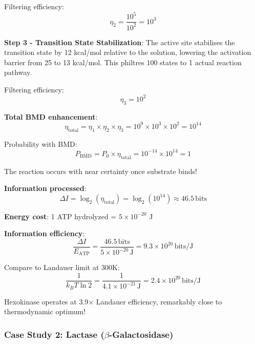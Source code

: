 \documentclass[11pt,onecolumn]{article}
\begin{document}
Filtering efficiency:
\begin{equation}
\eta_2 = \frac{10^5}{10^2} = 10^3
\end{equation}

\textbf{Step 3 - Transition State Stabilization}: The active site stabilises the transition state by 12 kcal/mol relative to the solution, lowering the activation barrier from 25 to 13 kcal/mol. This philtres 100 states to 1 actual reaction pathway.

Filtering efficiency:
\begin{equation}
\eta_3 = 10^2
\end{equation}

\textbf{Total BMD enhancement}:
\begin{equation}
\eta_{\text{total}} = \eta_1 \times \eta_2 \times \eta_3 = 10^9 \times 10^3 \times 10^2 = 10^{14}
\end{equation}

Probability with BMD:
\begin{equation}
P_{\text{BMD}} = P_0 \times \eta_{\text{total}} = 10^{-14} \times 10^{14} = 1
\end{equation}

The reaction occurs with near certainty once substrate binds!

\textbf{Information processed}:
\begin{equation}
\Delta I = \log_2(\eta_{\text{total}}) = \log_2(10^{14}) \approx 46.5\,\text{bits}
\end{equation}

\textbf{Energy cost}: 1 ATP hydrolyzed = $5 \times 10^{-20}$ J

\textbf{Information efficiency}:
\begin{equation}
\frac{\Delta I}{E_{\text{ATP}}} = \frac{46.5\,\text{bits}}{5 \times 10^{-20}\,\text{J}} = 9.3 \times 10^{20}\,\text{bits/J}
\end{equation}

Compare to Landauer limit at 300K:
\begin{equation}
\frac{1}{k_B T \ln 2} = \frac{1}{4.1 \times 10^{-21}\,\text{J}} = 2.4 \times 10^{20}\,\text{bits/J}
\end{equation}

Hexokinase operates at 3.9$\times$ Landauer efficiency, remarkably close to thermodynamic optimum!

\subsubsection{Case Study 2: Lactase ($\beta$-Galactosidase)}
\end{document}
